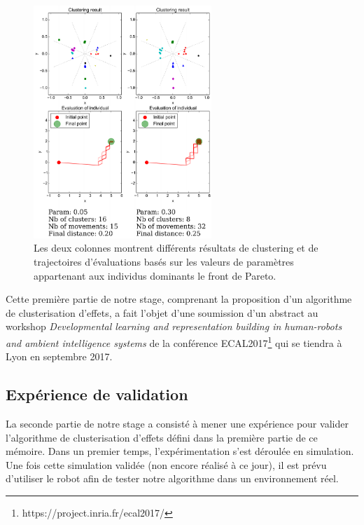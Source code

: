\documentclass[draft]{llncs}
\begin{document}
\begin{figure}[ht]
  \begin{center}
    \includegraphics[width=0.6\textwidth]{figures/Benchmark_3.pdf}
    \caption{Les deux colonnes montrent différents résultats de clustering et de trajectoires d'évaluations basés sur les valeurs de paramètres appartenant aux individus dominants le front de Pareto.}
    \label{fig:results}
  \end{center}
\end{figure}



Cette première partie de notre stage, comprenant la proposition d'un algorithme de clusterisation d'effets, a fait l'objet d'une soumission d'un abstract au workshop \textit{Developmental learning and representation building in human-robots and ambient intelligence systems} de la conférence ECAL2017\footnote{https://project.inria.fr/ecal2017/} qui se tiendra à Lyon en septembre 2017.






\subsection{Expérience de validation}

La seconde partie de notre stage a consisté à mener une expérience pour valider l'algorithme de clusterisation d'effets défini dans la première partie de ce mémoire.
Dans un premier temps, l'expérimentation s'est déroulée en simulation.
Une fois cette simulation validée (non encore réalisé à ce jour), il est prévu d'utiliser le robot afin de tester notre algorithme dans un environnement réel.
\end{document}
